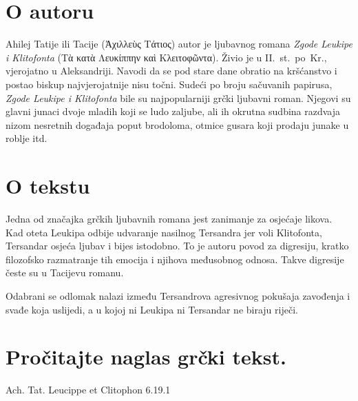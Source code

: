\section*{O autoru}

Ahilej Tatije ili Tacije \textgreek[variant=ancient]{(Ἀχιλλεὺς Τάτιος)} autor je ljubavnog romana \textit{Zgode Leukipe i Klitofonta} \textgreek[variant=ancient]{(Tὰ κατὰ Λευκίππην καὶ Κλειτοφῶντα).} Živio je u II.~st.\ po~Kr., vjerojatno u Aleksandriji. Navodi da se pod stare dane obratio na kršćanstvo i postao biskup najvjerojatnije nisu točni. Sudeći po broju sačuvanih papirusa, \textit{Zgode Leukipe i Klitofonta} bile su najpopularniji grčki ljubavni roman. Njegovi su glavni junaci dvoje mladih koji se ludo zaljube, ali ih okrutna sudbina razdvaja nizom nesretnih događaja poput brodoloma, otmice gusara koji prodaju junake u roblje itd.

\section*{O tekstu}

Jedna od značajka grčkih ljubavnih romana jest zanimanje za osjećaje likova. Kad oteta Leukipa odbije udvaranje nasilnog Tersandra jer voli Klitofonta, Tersandar osjeća ljubav i bijes istodobno. To je autoru povod za digresiju, kratko filozofsko razmatranje tih emocija i njihova međusobnog odnosa. Takve digresije česte su u Tacijevu romanu. 

Odabrani se odlomak nalazi između Tersandrova agresivnog pokušaja zavođenja i svađe koja uslijedi, a u kojoj ni Leukipa ni Tersandar ne biraju riječi.

\newpage

\section*{Pročitajte naglas grčki tekst.}

Ach. Tat. Leucippe et Clitophon 6.19.1


\medskip


